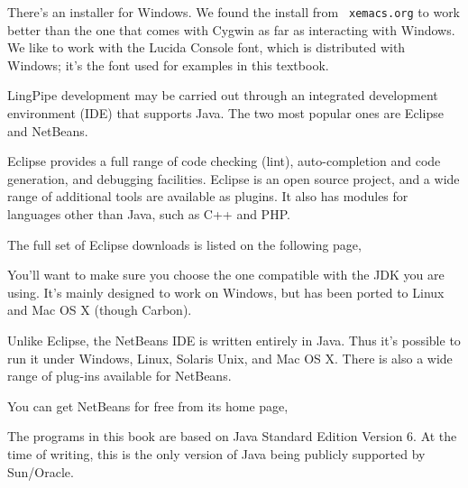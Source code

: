 \begin{quote}
\end{quote}


There's an installer for Windows.  We found the install from {\tt
xemacs.org} to work better than the one that comes with Cygwin as far
as interacting with Windows.  We like to work with the Lucida Console
font, which is distributed with Windows; it's the font used for examples
in this textbook.



\noindent
LingPipe development may be carried out through an integrated
development environment (IDE) that supports Java.  The two most
popular ones are Eclipse and NetBeans.  


\noindent
Eclipse provides a full range of code checking (lint), auto-completion
and code generation, and debugging facilities.  Eclipse is an open source
project, and a wide range of additional tools are available as plugins.  It
also has modules for languages other than Java, such as C++ and PHP.

The full set of Eclipse downloads is listed on the following page,
%
\begin{quote}
\end{quote}

You'll want to make sure you choose the one compatible with the JDK
you are using.  It's mainly designed to work on Windows, but has been
ported to Linux and Mac OS X (though Carbon).



\noindent
Unlike Eclipse, the NetBeans IDE is written entirely in Java.  Thus
it's possible to run it under Windows, Linux, Solaris Unix, and Mac OS
X. There is also a wide range of plug-ins available for NetBeans.

You can get NetBeans for free from its home page,
%
\begin{quote}
\end{quote}
%




\noindent
The programs in this book are based on Java Standard Edition Version
6.  At the time of writing, this is the only version of Java being
publicly supported by Sun/Oracle.

